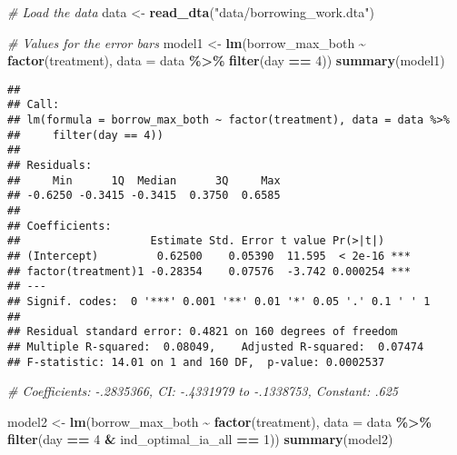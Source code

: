 \documentclass[
]{article}
\newenvironment{Shaded}{\begin{snugshade}}{\end{snugshade}}
\newcommand{\AttributeTok}[1]{\textcolor[rgb]{0.13,0.29,0.53}{#1}}
\newcommand{\CommentTok}[1]{\textcolor[rgb]{0.56,0.35,0.01}{\textit{#1}}}
\newcommand{\DecValTok}[1]{\textcolor[rgb]{0.00,0.00,0.81}{#1}}
\newcommand{\FunctionTok}[1]{\textcolor[rgb]{0.13,0.29,0.53}{\textbf{#1}}}
\newcommand{\NormalTok}[1]{#1}
\newcommand{\OtherTok}[1]{\textcolor[rgb]{0.56,0.35,0.01}{#1}}
\newcommand{\SpecialCharTok}[1]{\textcolor[rgb]{0.81,0.36,0.00}{\textbf{#1}}}
\newcommand{\StringTok}[1]{\textcolor[rgb]{0.31,0.60,0.02}{#1}}
\begin{document}
\begin{Shaded}
\begin{Highlighting}[]
\CommentTok{\# Load the data}
\NormalTok{data }\OtherTok{\textless{}{-}} \FunctionTok{read\_dta}\NormalTok{(}\StringTok{"data/borrowing\_work.dta"}\NormalTok{)}

\CommentTok{\# Values for the error bars}
\NormalTok{model1 }\OtherTok{\textless{}{-}} \FunctionTok{lm}\NormalTok{(borrow\_max\_both }\SpecialCharTok{\textasciitilde{}} \FunctionTok{factor}\NormalTok{(treatment), }\AttributeTok{data =}\NormalTok{ data }\SpecialCharTok{\%\textgreater{}\%} \FunctionTok{filter}\NormalTok{(day }\SpecialCharTok{==} \DecValTok{4}\NormalTok{))}
\FunctionTok{summary}\NormalTok{(model1)}
\end{Highlighting}
\end{Shaded}

\begin{verbatim}
## 
## Call:
## lm(formula = borrow_max_both ~ factor(treatment), data = data %>% 
##     filter(day == 4))
## 
## Residuals:
##     Min      1Q  Median      3Q     Max 
## -0.6250 -0.3415 -0.3415  0.3750  0.6585 
## 
## Coefficients:
##                    Estimate Std. Error t value Pr(>|t|)    
## (Intercept)         0.62500    0.05390  11.595  < 2e-16 ***
## factor(treatment)1 -0.28354    0.07576  -3.742 0.000254 ***
## ---
## Signif. codes:  0 '***' 0.001 '**' 0.01 '*' 0.05 '.' 0.1 ' ' 1
## 
## Residual standard error: 0.4821 on 160 degrees of freedom
## Multiple R-squared:  0.08049,    Adjusted R-squared:  0.07474 
## F-statistic: 14.01 on 1 and 160 DF,  p-value: 0.0002537
\end{verbatim}

\begin{Shaded}
\begin{Highlighting}[]
\CommentTok{\# Coefficients: {-}.2835366, CI: {-}.4331979 to {-}.1338753, Constant: .625}

\NormalTok{model2 }\OtherTok{\textless{}{-}} \FunctionTok{lm}\NormalTok{(borrow\_max\_both }\SpecialCharTok{\textasciitilde{}} \FunctionTok{factor}\NormalTok{(treatment), }\AttributeTok{data =}\NormalTok{ data }\SpecialCharTok{\%\textgreater{}\%} \FunctionTok{filter}\NormalTok{(day }\SpecialCharTok{==} \DecValTok{4} \SpecialCharTok{\&}\NormalTok{ ind\_optimal\_ia\_all }\SpecialCharTok{==} \DecValTok{1}\NormalTok{))}
\FunctionTok{summary}\NormalTok{(model2)}
\end{Highlighting}
\end{Shaded}
\end{document}
